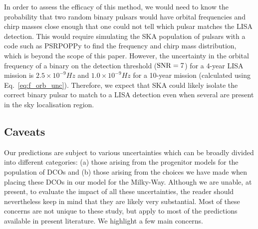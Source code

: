 In order to assess the efficacy of this method, we would need to know the probability that two random binary pulsars would have orbital frequencies and chirp masses close enough that one could not tell which pulsar matches the LISA detection. This would require simulating the SKA population of pulsars with a code such as PSRPOPPy \citep{Bates+2014} to find the frequency and chirp mass distribution, which is beyond the scope of this paper. However, the uncertainty in the orbital frequency of a binary on the detection threshold (${\rm SNR} = 7$) for a 4-year LISA mission is $2.5 \times 10^{-9} \unit{Hz}$ and $1.0 \times 10^{-9} \unit{Hz}$ for a 10-year mission (calculated using Eq.~\ref{eq:f_orb_unc}). Therefore, we expect that SKA could likely isolate the correct binary pulsar to match to a LISA detection even when several are present in the sky localisation region.

\subsection{Caveats}\label{sec:caveats}

Our predictions are subject to various uncertainties which can be broadly divided into different categories: (a) those arising from the progenitor models for the population of DCOs and (b) those arising from the choices we have made when placing these DCOs in our model for the Milky-Way. Although we are unable, at present, to evaluate the impact of all these uncertainties, the reader should nevertheless keep in mind that they are likely very substantial. Most of these concerns are not unique to these study, but apply to most of the predictions available in present literature. We highlight a few main concerns. 

